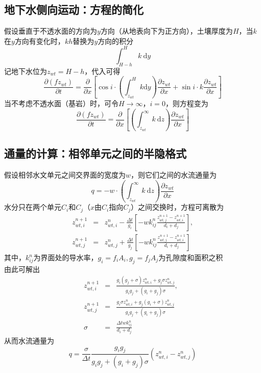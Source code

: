 \subsection{地下水侧向运动：方程的简化}
假设垂直于不透水面的方向为$y$方向（从地表向下为正方向），土壤厚度为$H$，当$k$在$y$方向有变化时，$kh$替换为$y$方向的积分
\begin{equation}
\int^H_{H-h} k \  \mathrm{d}y
\end{equation}
记地下水位为$z_{wt}=H-h$，代入可得
\begin{equation}
\frac{\partial \left(fz_{wt}\right)}{\partial t} = \frac{\partial}{\partial x} \left[ \cos i \cdot \left(\int^{H}_{z_{wt}} k \mathrm{d}y\right)\frac{\partial z_{wt}}{\partial x} +\sin i\cdot k\frac{\partial z_{wt}}{\partial x}\right]
\end{equation}
当不考虑不透水面（基岩）时，可令$H\to \infty$，$i=0$，则方程变为
\begin{equation}
\frac{\partial \left(fz_{wt}\right)}{\partial t} = \frac{\partial}{\partial x} \left[ \left(\int^\infty_{z_{wt}} k\ \mathrm{d}z\right)\frac{\partial z_{wt}}{\partial x} \right]
\end{equation}

\subsection{通量的计算：相邻单元之间的半隐格式}
假设相邻水文单元之间交界面的宽度为$w$，则它们之间的水流通量为
$$q=-w\cdot \left(\int^\infty_{z_{wt}} k\ \mathrm{d}z\right)\frac{\partial z_{wt}}{\partial x} $$
水分只在两个单元$C_i$和$C_j$（$x$由$C_i$指向$C_j$）之间交换时，方程可离散为
\begin{eqnarray}
z_{wt,i}^{n+1} &=& z_{wt,i}^{n} - \frac{\Delta t}{g_i}\left[ -  w k^n_{ij} \frac{z_{wt,j}^{n+1} - z_{wt,i}^{n+1}}{d_i+d_j} \right], \\
z_{wt,j}^{n+1} &=& z_{wt,j}^{n} + \frac{\Delta t}{g_j}\left[ -  w k^n_{ij} \frac{z_{wt,j}^{n+1} - z_{wt,i}^{n+1}}{d_i+d_j} \right]
\end{eqnarray}
其中，$k^n_{ij}$为界面处的导水率，$g_i=f_iA_i,g_j=f_jA_j$为孔隙度和面积之积\\
由此可解出
\begin{eqnarray}
z_{wt,i}^{n+1} &=& \frac{g_i\left(g_j+\sigma\right)z_{wt,i}^{n} +g_j\sigma z_{wt,j}^{n}}{g_ig_j+\left(g_i+g_j\right)\sigma},\\
z_{wt,j}^{n+1} &=& \frac{g_i\sigma z_{wt,i}^{n} +g_j\left(g_i+\sigma\right)z_{wt,j}^{n}}{g_ig_j+\left(g_i+g_j\right)\sigma}\quad \\
\sigma &=& \frac{\Delta t wk_{ij}^n}{d_i+d_j}
\end{eqnarray}
从而水流通量为
\begin{equation}
q = \frac{\sigma}{\Delta t} \frac{g_ig_j}{g_ig_j+\left(g_i+g_j\right)\sigma} \left( z_{wt,i}^{n} - z_{wt,j}^{n} \right)
\end{equation}

